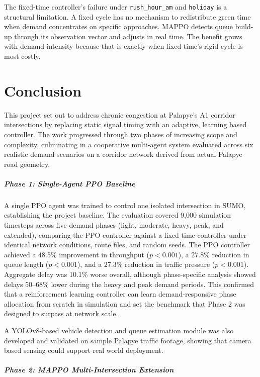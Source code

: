 ﻿\documentclass[11pt, a4paper]{report}
\begin{document}
The fixed-time controller's failure under \texttt{rush\_hour\_am} and \texttt{holiday} is a structural limitation. A fixed cycle has no mechanism to redistribute green time when demand concentrates on specific approaches. MAPPO detects queue build-up through its observation vector and adjusts in real time. The benefit grows with demand intensity because that is exactly when fixed-time's rigid cycle is most costly.

\chapter{Conclusion}

This project set out to address chronic congestion at Palapye's A1 corridor intersections by replacing static signal timing with an adaptive, learning based controller. The work progressed through two phases of increasing scope and complexity, culminating in a cooperative multi-agent system evaluated across six realistic demand scenarios on a corridor network derived from actual Palapye road geometry.

\paragraph{Phase 1: Single-Agent PPO Baseline}
A single PPO agent was trained to control one isolated intersection in SUMO, establishing the project baseline. The evaluation covered 9,000 simulation timesteps across five demand phases (light, moderate, heavy, peak, and extended), comparing the PPO controller against a fixed time controller under identical network conditions, route files, and random seeds. The PPO controller achieved a 48.5\% improvement in throughput ($p < 0.001$), a 27.8\% reduction in queue length ($p < 0.001$), and a 27.3\% reduction in traffic pressure ($p < 0.001$). Aggregate delay was 10.1\% worse overall, although phase-specific analysis showed delays 50--68\% lower during the heavy and peak demand periods. This confirmed that a reinforcement learning controller can learn demand-responsive phase allocation from scratch in simulation and set the benchmark that Phase 2 was designed to surpass at network scale.

A YOLOv8-based vehicle detection and queue estimation module was also developed and validated on sample Palapye traffic footage, showing that camera based sensing could support real world deployment.

\paragraph{Phase 2: MAPPO Multi-Intersection Extension}
\end{document}
